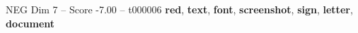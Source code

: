 \begin{textsample}{NEG Dim 7 – Score -7.00 – t000006}  \label{ex:f7_neg_028}
\textbf{red}, \textbf{text}, \textbf{font}, \textbf{screenshot}, \textbf{sign}, \textbf{letter}, \textbf{document}

\end{textsample}
